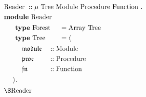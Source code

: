 \documentclass[12pt, preview]{standalone}
\begin{document}
\begin{math}
\begin{aligned}
  \ & \mathrm{Reader\ } :: \mu \mathrm{\ Tree\ } \mathrm{Module\ } \mathrm{Procedure\ } \mathrm{Function\ } \mathbf{.}  \\
    & \mathbf{module\ } \mathrm{Reader}  \\
    & \ 
  \begin{aligned}
    \quad & \ 
      \begin{aligned}
        & \mathbf{type\ } \mathrm{Forest\ } & & = \mathrm{Array\ } \mathrm{Tree\ } \\
        & \mathbf{type\ } \mathrm{Tree\ } & & = \langle \\
      \end{aligned} \\
          & \quad \ 
    \begin{aligned}
      & \mathfrak{module} & & :: \mathrm{Module} \\
      & \mathfrak{proc}   & & :: \mathrm{Procedure} \\
      & \mathfrak{fn}     & & :: \mathrm{Function} \\
    \end{aligned} \\
          & \rangle \mathbf{.} \\
  \end{aligned} \\
  & \mathbf{\S}\mathrm{Reader}
\end{aligned}
\end{math}
\end{document}
